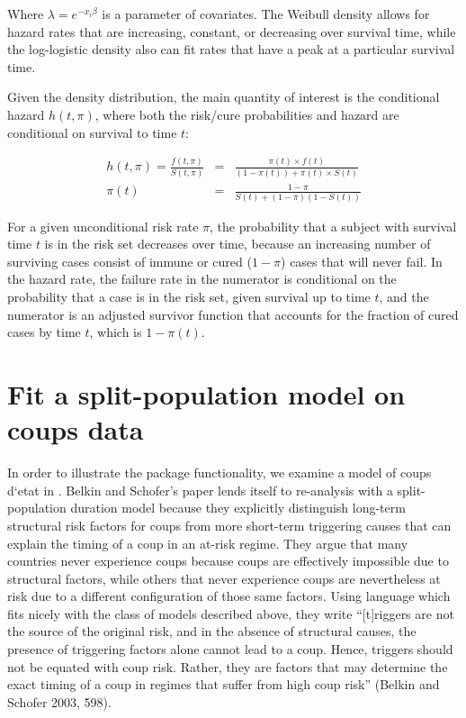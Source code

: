 \documentclass[article]{jss}
\begin{document}
Where \(\lambda = e^{-x_i\beta}\) is a parameter of covariates. The
Weibull density allows for hazard rates that are increasing, constant,
or decreasing over survival time, while the log-logistic density also
can fit rates that have a peak at a particular survival time.

Given the density distribution, the main quantity of interest is the
conditional hazard \(h(t, \pi)\), where both the risk/cure probabilities
and hazard are conditional on survival to time \(t\):

\begin{eqnarray}
h(t, \pi) = \frac{f(t, \pi)}{S(t, \pi)} & = & \frac{ \pi(t) \times f(t) }{ (1-\pi(t)) + \pi(t) \times S(t) } \\
 \pi(t) & = & \frac{ 1-\pi }{ S(t) + (1-\pi) (1 - S(t)) }
\end{eqnarray}

For a given unconditional risk rate \(\pi\), the probability that a
subject with survival time \(t\) is in the risk set decreases over time,
because an increasing number of surviving cases consist of immune or
cured (\(1-\pi\)) cases that will never fail. In the hazard rate, the
failure rate in the numerator is conditional on the probability that a
case is in the risk set, given survival up to time \(t\), and the
numerator is an adjusted survivor function that accounts for the
fraction of cured cases by time \(t\), which is \(1-\pi(t)\).

\section{Fit a split-population model on coups
data}

In order to illustrate the package functionality, we examine a model of
coups d`etat in \citet{belkin2003toward}. Belkin and Schofer's paper
lends itself to re-analysis with a split-population duration model
because they explicitly distinguish long-term structural risk factors
for coups from more short-term triggering causes that can explain the
timing of a coup in an at-risk regime. They argue that many countries
never experience coups because coups are effectively impossible due to
structural factors, while others that never experience coups are
nevertheless at risk due to a different configuration of those same
factors. Using language which fits nicely with the class of models
described above, they write ``{[}t{]}riggers are not the source of the
original risk, and in the absence of structural causes, the presence of
triggering factors alone cannot lead to a coup. Hence, triggers should
not be equated with coup risk. Rather, they are factors that may
determine the exact timing of a coup in regimes that suffer from high
coup risk'' (Belkin and Schofer 2003, 598).
\end{document}
